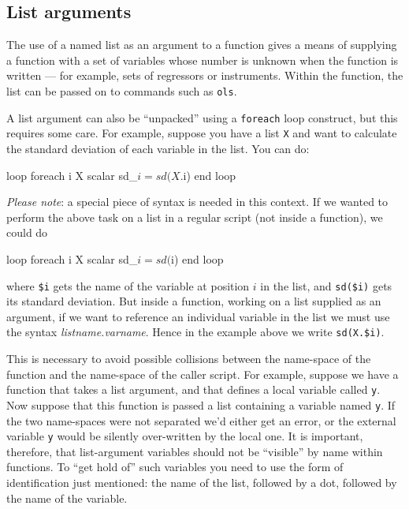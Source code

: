 \subsection{List arguments}

The use of a named list as an argument to a function gives a means of
supplying a function with a set of variables whose number is unknown
when the function is written --- for example, sets of regressors or
instruments.  Within the function, the list can be passed on to
commands such as \texttt{ols}.  

A list argument can also be ``unpacked'' using a \texttt{foreach} loop
construct, but this requires some care.  For example, suppose you have
a list \texttt{X} and want to calculate the standard deviation of each
variable in the list.  You can do:
%
\begin{code}
loop foreach i X
   scalar sd_$i = sd(X.$i)
end loop
\end{code}

\textit{Please note}: a special piece of syntax is needed in this
context.  If we wanted to perform the above task on a list in a
regular script (not inside a function), we could do
%
\begin{code}
loop foreach i X
   scalar sd_$i = sd($i)
end loop
\end{code}
%
where \verb|$i| gets the name of the variable at position $i$ in the
list, and \verb|sd($i)| gets its standard deviation.  But inside a
function, working on a list supplied as an argument, if we want to
reference an individual variable in the list we must use the syntax
\textsl{listname.varname}.  Hence in the example above we write
\verb|sd(X.$i)|.

This is necessary to avoid possible collisions between the name-space
of the function and the name-space of the caller script.  For example,
suppose we have a function that takes a list argument, and that
defines a local variable called \texttt{y}.  Now suppose that this
function is passed a list containing a variable named \texttt{y}.  If
the two name-spaces were not separated we'd either get an error, or
the external variable \texttt{y} would be silently over-written by the
local one.  It is important, therefore, that list-argument variables
should not be ``visible'' by name within functions.  To ``get hold
of'' such variables you need to use the form of identification just
mentioned: the name of the list, followed by a dot, followed by the
name of the variable.


